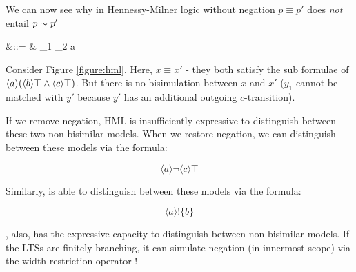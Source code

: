 
We can now see why in Hennessy-Milner logic without negation $p \equiv
p'$ does \emph{not} entail $p \sim p'$

\begin{GRAMMAR}
  \phi 
    &\quad ::= \quad&
  \top \fOr \phi_1 \AND \phi_2  \fOr \langle a \rangle \phi
\end{GRAMMAR}



\NI Consider Figure \ref{figure:hml}.  Here, $x \equiv x'$ - they both
satisfy the sub formulae of $\langle a \rangle (\langle b \rangle \top
\land \langle c \rangle \top)$.  But there is no bisimulation between
$x$ and $x'$ ($y_1$ cannot be matched with $y'$ because $y'$ has an
additional outgoing $c$-transition).

If we remove negation, HML is insufficiently expressive to distinguish
between these two non-bisimilar models.  When we restore negation, we
can distinguish between these models via the formula:

\[
   \langle a \rangle \neg \langle c \rangle \top
\]

\NI Similarly, \ELABR{} is able to distinguish between these models via the
formula:

\[
  \langle a \rangle ! \{b\}
\]

\NI \ELABR{}, also, has the expressive capacity to distinguish between
non-bisimilar models. If the LTSs are finitely-branching, it can
simulate negation (in innermost scope) via the width restriction
operator !
